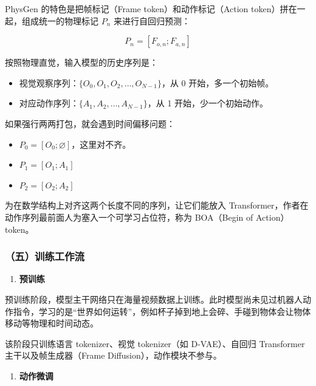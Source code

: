 PhysGen 的特色是把帧标记（Frame token）和动作标记（Action token）拼在一起，组成统一的物理标记 \(P_n\) 来进行自回归预测：

\[
P_n = [F_{o,n}; F_{a,n}]
\]

按照物理直觉，输入模型的历史序列是：

\begin{itemize}
\tightlist
\item
  视觉观察序列：\(\{O_0,O_1,O_2,\ldots,O_{N-1}\}\)，从 0 开始，多一个初始帧。
\item
  对应动作序列：\(\{A_1,A_2,\ldots,A_{N-1}\}\)，从 1 开始，少一个初始动作。
\end{itemize}

如果强行两两打包，就会遇到时间偏移问题：

\begin{itemize}
\tightlist
\item
  \(P_0 = [O_0; \varnothing]\)，这里对不齐。
\item
  \(P_1 = [O_1; A_1]\)
\item
  \(P_2 = [O_2; A_2]\)
\end{itemize}

为在数学结构上对齐这两个长度不同的序列，让它们能放入 Transformer，作者在动作序列最前面人为塞入一个可学习占位符，称为 BOA（Begin of Action）token。

\hypertarget{ux4e94ux8badux7ec3ux5de5ux4f5cux6d41}{%
\subsubsection{（五）训练工作流}\label{ux4e94ux8badux7ec3ux5de5ux4f5cux6d41}}

\begin{enumerate}
\def\labelenumi{\arabic{enumi}.}
\tightlist
\item
  \textbf{预训练}
\end{enumerate}

预训练阶段，模型主干网络只在海量视频数据上训练。此时模型尚未见过机器人动作指令，学习的是``世界如何运转''，例如杯子掉到地上会碎、手碰到物体会让物体移动等物理和时间动态。

该阶段只训练语言 tokenizer、视觉 tokenizer（如 D-VAE）、自回归 Transformer 主干以及帧生成器（Frame Diffusion），动作模块不参与。

\begin{enumerate}
\def\labelenumi{\arabic{enumi}.}
\setcounter{enumi}{1}
\tightlist
\item
  \textbf{动作微调}
\end{enumerate}

